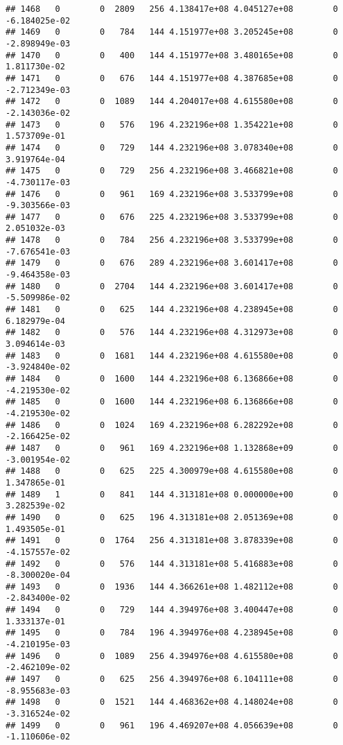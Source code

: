 \documentclass[
]{article}
\begin{document}
\begin{enumerate}
\begin{verbatim}
## 1468   0        0  2809   256 4.138417e+08 4.045127e+08        0 -6.184025e-02
## 1469   0        0   784   144 4.151977e+08 3.205245e+08        0 -2.898949e-03
## 1470   0        0   400   144 4.151977e+08 3.480165e+08        0  1.811730e-02
## 1471   0        0   676   144 4.151977e+08 4.387685e+08        0 -2.712349e-03
## 1472   0        0  1089   144 4.204017e+08 4.615580e+08        0 -2.143036e-02
## 1473   0        0   576   196 4.232196e+08 1.354221e+08        0  1.573709e-01
## 1474   0        0   729   144 4.232196e+08 3.078340e+08        0  3.919764e-04
## 1475   0        0   729   256 4.232196e+08 3.466821e+08        0 -4.730117e-03
## 1476   0        0   961   169 4.232196e+08 3.533799e+08        0 -9.303566e-03
## 1477   0        0   676   225 4.232196e+08 3.533799e+08        0  2.051032e-03
## 1478   0        0   784   256 4.232196e+08 3.533799e+08        0 -7.676541e-03
## 1479   0        0   676   289 4.232196e+08 3.601417e+08        0 -9.464358e-03
## 1480   0        0  2704   144 4.232196e+08 3.601417e+08        0 -5.509986e-02
## 1481   0        0   625   144 4.232196e+08 4.238945e+08        0  6.182979e-04
## 1482   0        0   576   144 4.232196e+08 4.312973e+08        0  3.094614e-03
## 1483   0        0  1681   144 4.232196e+08 4.615580e+08        0 -3.924840e-02
## 1484   0        0  1600   144 4.232196e+08 6.136866e+08        0 -4.219530e-02
## 1485   0        0  1600   144 4.232196e+08 6.136866e+08        0 -4.219530e-02
## 1486   0        0  1024   169 4.232196e+08 6.282292e+08        0 -2.166425e-02
## 1487   0        0   961   169 4.232196e+08 1.132868e+09        0 -3.001954e-02
## 1488   0        0   625   225 4.300979e+08 4.615580e+08        0  1.347865e-01
## 1489   1        0   841   144 4.313181e+08 0.000000e+00        0  3.282539e-02
## 1490   0        0   625   196 4.313181e+08 2.051369e+08        0  1.493505e-01
## 1491   0        0  1764   256 4.313181e+08 3.878339e+08        0 -4.157557e-02
## 1492   0        0   576   144 4.313181e+08 5.416883e+08        0 -8.300020e-04
## 1493   0        0  1936   144 4.366261e+08 1.482112e+08        0 -2.843400e-02
## 1494   0        0   729   144 4.394976e+08 3.400447e+08        0  1.333137e-01
## 1495   0        0   784   196 4.394976e+08 4.238945e+08        0 -4.210195e-03
## 1496   0        0  1089   256 4.394976e+08 4.615580e+08        0 -2.462109e-02
## 1497   0        0   625   256 4.394976e+08 6.104111e+08        0 -8.955683e-03
## 1498   0        0  1521   144 4.468362e+08 4.148024e+08        0 -3.316524e-02
## 1499   0        0   961   196 4.469207e+08 4.056639e+08        0 -1.110606e-02

\end{verbatim}
\end{enumerate}
\end{document}
